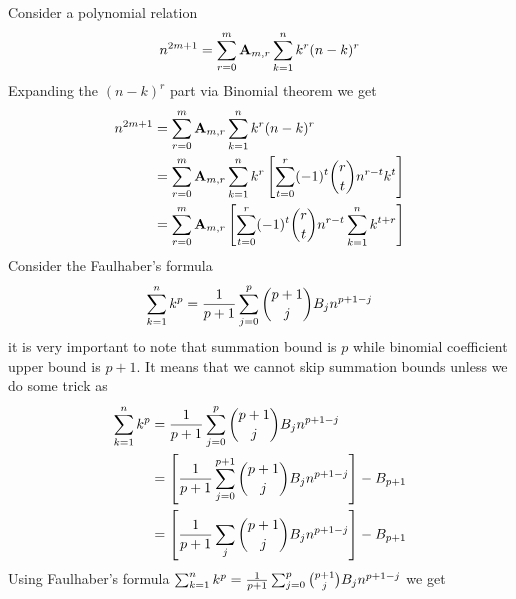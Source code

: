 Consider a polynomial relation
\begin{equation*}
    n^{2m+1} = \sum_{r=0}^{m} {\mathbf{A}} \sb{m,r} \sum_{k=1}^{n} k^{r} (n-k)^{r}
\end{equation*}
Expanding the $(n-k)^r$ part via Binomial theorem we get
\begin{equation*}
    \begin{split}
        n^{2m+1} &= \sum_{r=0}^{m} {\mathbf{A}} \sb{m,r} \sum_{k=1}^{n} k^{r} (n-k)^{r} \\
        &= \sum_{r=0}^{m} {\mathbf{A}} \sb{m,r} \sum_{k=1}^{n} k^{r} \left[ \sum_{t=0}^{r} (-1)^t \binom{r}{t} n^{r-t} k^{t} \right] \\
        &= \sum_{r=0}^{m} {\mathbf{A}} \sb{m,r} \left[ \sum_{t=0}^{r} (-1)^t \binom{r}{t} n^{r-t} \sum_{k=1}^{n} k^{t+r} \right] \\
    \end{split}
\end{equation*}
Consider the Faulhaber's formula
\begin{equation*}
    \sum_{k=1}^{n} k^{p} = \frac{1}{p+1}\sum_{j=0}^{p} \binom{p+1}{j} {B}\sb{j} n^{p+1-j}
\end{equation*}
it is very important to note that summation bound is $p$ while binomial coefficient upper bound is $p+1$.
It means that we cannot skip summation bounds unless we do some trick as
\begin{equation}
    \begin{split}
        \sum_{k=1}^{n} k^{p} &= \frac{1}{p+1}\sum_{j=0}^{p} \binom{p+1}{j} {B}\sb{j} n^{p+1-j} \\
        &= \left[ \frac{1}{p+1}\sum_{j=0}^{p+1} \binom{p+1}{j} {B}\sb{j} n^{p+1-j} \right] - {B}\sb{p+1} \\
        &= \left[ \frac{1}{p+1}\sum_{j} \binom{p+1}{j} {B}\sb{j} n^{p+1-j} \right] - {B}\sb{p+1} \\
    \end{split}\label{eq:faulhaber-formula}
\end{equation}
Using Faulhaber's formula
$\sum_{k=1}^{n} k^{p} = \frac{1}{p+1}\sum_{j=0}^{p} \binom{p+1}{j} {B}\sb{j} n^{p+1-j}$
we get
